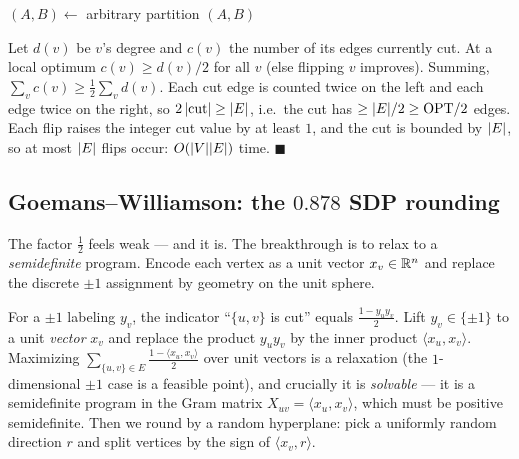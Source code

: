 \begin{algorithm}[H]
\caption{\textsc{LocalMaxCut}$(\Gph)$}\label{ch38:alg-localcut}
\DontPrintSemicolon
$(A,B)\gets$ arbitrary partition\;
\Return $(A,B)$\;
\end{algorithm}

\begin{whybox}
Let $d(v)$ be $v$'s degree and $c(v)$ the number of its edges currently cut. At a local optimum
$c(v)\ge d(v)/2$ for all $v$ (else flipping $v$ improves). Summing, $\sum_v c(v)\ge\tfrac12\sum_v
d(v)$. Each cut edge is counted twice on the left and each edge twice on the right, so
$2\,\lvert\text{cut}\rvert\ge \lvert E\rvert$, i.e.\ the cut has $\ge\lvert E\rvert/2\ge\mathrm{OPT}/2$ edges. Each flip
raises the integer cut value by at least $1$, and the cut is bounded by $\lvert E\rvert$, so at most $\lvert E\rvert$
flips occur: $O(\lvert V\rvert\lvert E\rvert)$ time. $\blacksquare$
\end{whybox}

\subsection{Goemans--Williamson: the $0.878$ SDP rounding}

The factor $\tfrac12$ feels weak --- and it is. The breakthrough is to relax to a
\emph{semidefinite} program. Encode each vertex as a unit vector $x_v\in\mathbb{R}^n$ and replace the discrete
$\pm 1$ assignment by geometry on the unit sphere.

\begin{intuitionbox}
For a $\pm1$ labeling $y_v$, the indicator ``$\{u,v\}$ is cut'' equals $\tfrac{1-y_uy_v}{2}$. Lift
$y_v\in\{\pm1\}$ to a unit \emph{vector} $x_v$ and replace the product $y_uy_v$ by the inner product
$\langle x_u,x_v\rangle$. Maximizing $\sum_{\{u,v\}\in E}\tfrac{1-\langle x_u,x_v\rangle}{2}$ over unit
vectors is a relaxation (the $1$-dimensional $\pm1$ case is a feasible point), and crucially it is
\emph{solvable} --- it is a semidefinite program in the Gram matrix $X_{uv}=\langle x_u,x_v\rangle$,
which must be positive semidefinite. Then we round by a random hyperplane: pick a uniformly random
direction $r$ and split vertices by the sign of $\langle x_v, r\rangle$.
\end{intuitionbox}

\begin{center}
\end{center}

